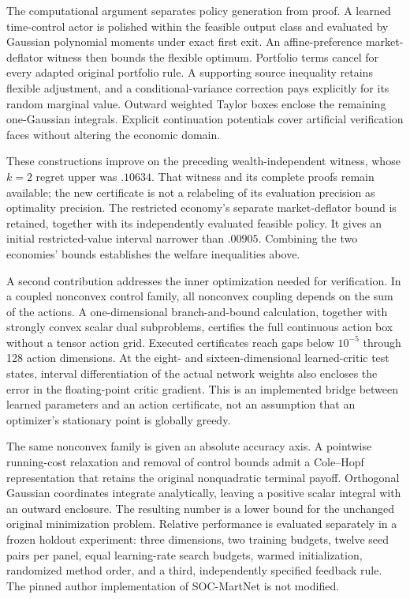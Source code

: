 The computational argument separates policy generation from proof. A learned time-control actor is polished within the feasible output class and evaluated by Gaussian polynomial moments under exact first exit. An affine-preference market-deflator witness then bounds the flexible optimum. Portfolio terms cancel for every adapted original portfolio rule. A supporting source inequality retains flexible adjustment, and a conditional-variance correction pays explicitly for its random marginal value. Outward weighted Taylor boxes enclose the remaining one-Gaussian integrals. Explicit continuation potentials cover artificial verification faces without altering the economic domain.

These constructions improve on the preceding wealth-independent witness, whose $k=2$ regret upper was $.10634$. That witness and its complete proofs remain available; the new certificate is not a relabeling of its evaluation precision as optimality precision. The restricted economy's separate market-deflator bound is retained, together with its independently evaluated feasible policy. It gives an initial restricted-value interval narrower than $.00905$. Combining the two economies' bounds establishes the welfare inequalities above.

A second contribution addresses the inner optimization needed for verification. In a coupled nonconvex control family, all nonconvex coupling depends on the sum of the actions. A one-dimensional branch-and-bound calculation, together with strongly convex scalar dual subproblems, certifies the full continuous action box without a tensor action grid. Executed certificates reach gaps below $10^{-5}$ through 128 action dimensions. At the eight- and sixteen-dimensional learned-critic test states, interval differentiation of the actual network weights also encloses the error in the floating-point critic gradient. This is an implemented bridge between learned parameters and an action certificate, not an assumption that an optimizer's stationary point is globally greedy.

The same nonconvex family is given an absolute accuracy axis. A pointwise running-cost relaxation and removal of control bounds admit a Cole--Hopf representation that retains the original nonquadratic terminal payoff. Orthogonal Gaussian coordinates integrate analytically, leaving a positive scalar integral with an outward enclosure. The resulting number is a lower bound for the unchanged original minimization problem. Relative performance is evaluated separately in a frozen holdout experiment: three dimensions, two training budgets, twelve seed pairs per panel, equal learning-rate search budgets, warmed initialization, randomized method order, and a third, independently specified feedback rule. The pinned author implementation of SOC-MartNet is not modified.

